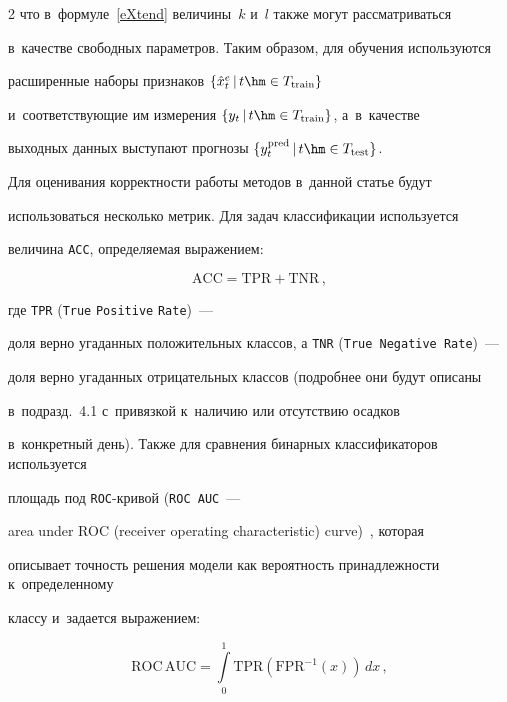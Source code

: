 \begin{multicols}{2}
что  в~формуле~\eqref{eXtend} величины~$k$ и~$l$ также могут рассматриваться

 в~качестве свободных параметров. Таким образом, для обучения используются 

 расширенные наборы признаков $\{\hat{x}^e_t\,|\, t \hm\in T_{\mathrm{train}}\}$ 

 и~соответствующие им измерения $\{y_t\,|\,t \hm\in T_{\mathrm{train}}\}$, а~в~качестве 

 выходных данных выступают прогнозы $\{y^{\mathrm{pred}}_t\,|\,t \hm\in T_{\mathrm{test}}\}$.



Для оценивания корректности работы методов в~данной статье будут 

использоваться несколько метрик. Для задач классификации используется 

величина \verb"ACC", определяемая выражением:

\begin{equation}

\label{ACC}

\mathrm{ACC= TPR + TNR}\,,

\end{equation}

где \verb"TPR" (\verb"True" \verb"Positive" \verb"Rate")~--- 

доля верно угаданных положительных классов, а \verb"TNR" (\verb"True Negative Rate")~--- 

доля верно угаданных отрицательных классов (подробнее они будут описаны 

в~подразд.~4.1 с~привязкой к~наличию или отсутствию осадков 

в~конкретный день). Также для сравнения бинарных классификаторов используется 

площадь под \verb"ROC"-кри\-вой (\verb"ROC AUC"~---

area under ROC (receiver operating characteristic) curve)~\cite{Huang2005}, которая 

описывает точность решения модели как вероятность принадлежности к~определенному 

классу и~задается выражением:

\begin{equation}

\label{AUC}

\mathrm{ROC\,AUC} = \int\limits_{0}^{1} \mathrm{TPR}\left(\mathrm{FPR}^{-1}(x)\right)\,dx\,,

\end{equation}


\end{multicols}
